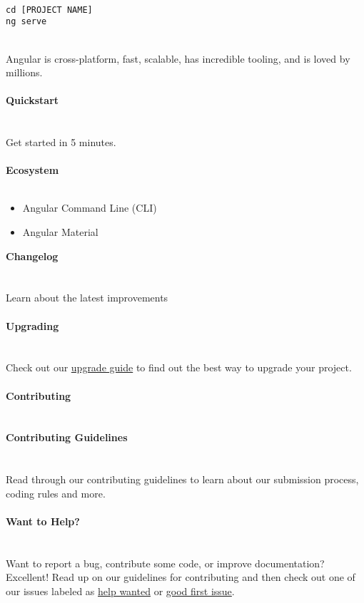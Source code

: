 \documentclass{article}
\begin{document}
\\
\begin{lstlisting}
cd [PROJECT NAME]
ng serve
\end{lstlisting}
\\
Angular is cross-platform, fast, scalable, has incredible tooling, and is loved by millions.\\
\\
{\noindent \LARGE \textbf{Quickstart}}\\\\
\\
Get started in 5 minutes.\\
\\
{\noindent \LARGE \textbf{Ecosystem}}\\\\
\begin{itemize}
	\item Angular Command Line (CLI)
	\item Angular Material
\end{itemize}
{\noindent \LARGE \textbf{Changelog}}\\\\
\\
Learn about the latest improvements\\
\\
{\noindent \LARGE \textbf{Upgrading}}\\\\
\\
Check out our \href{https://update.angular.io/}{upgrade guide} to find out the best way to upgrade your project.\\
\\
{\noindent \LARGE \textbf{Contributing}}\\\\
\\
{\noindent \Large \textbf{Contributing Guidelines}}\\\\
\\
Read through our contributing guidelines to learn about our submission process, coding rules and more.\\
\\
{\noindent \Large \textbf{Want to Help?}}\\\\
\\
Want to report a bug, contribute some code, or improve documentation? Excellent! Read up on our guidelines for contributing and then check out one of our issues labeled as \href{https://github.com/angular/angular/labels/help%20wanted}{help wanted} or \href{https://github.com/angular/angular/labels/good%20first%20issue}{good first issue}.\\
\end{document}
